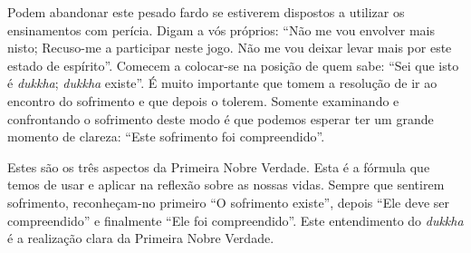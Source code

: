 Podem abandonar este pesado fardo se estiverem dispostos a utilizar os
ensinamentos com perícia. Digam a vós próprios: “Não me vou envolver mais nisto;
Recuso-me a participar neste jogo. Não me vou deixar levar mais por este estado
de espírito”. Comecem a colocar-se na posição de quem sabe: “Sei que isto é
\emph{dukkha}; \emph{dukkha} existe”. É muito importante que tomem a resolução
de ir ao encontro do sofrimento e que depois o tolerem. Somente examinando e
confrontando o sofrimento deste modo é que podemos esperar ter um grande momento
de clareza: “Este sofrimento foi compreendido”.

Estes são os três aspectos da Primeira Nobre Verdade. Esta é a fórmula que temos
de usar e aplicar na reflexão sobre as nossas vidas. Sempre que sentirem
sofrimento, reconheçam-no primeiro “O sofrimento existe”, depois “Ele deve ser
compreendido” e finalmente “Ele foi compreendido”. Este entendimento do
\emph{dukkha} é a realização clara da Primeira Nobre Verdade.

